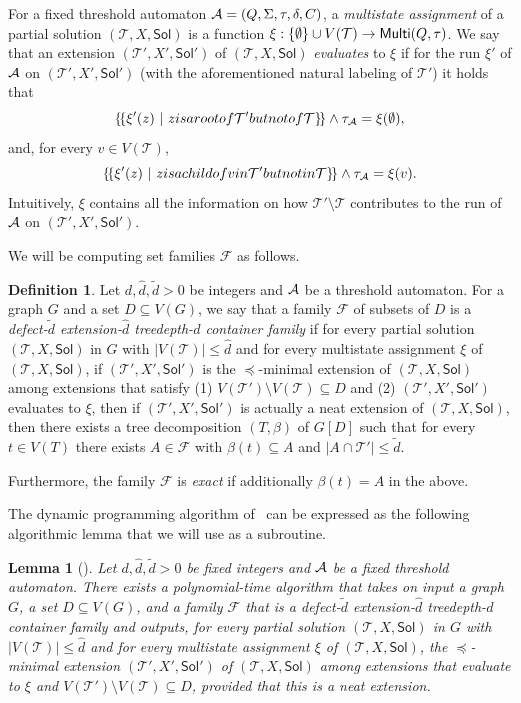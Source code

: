 \documentclass[11pt,a4paper]{article}
\newtheorem{lemma}[theorem]{Lemma}
\theoremstyle{definition}
\newtheorem{definition}[theorem]{Definition}
\def\T{\mathcal{T}}
\def\Sol{\mathsf{Sol}}
\begin{document}
For a fixed threshold automaton $\mathcal{A} = (Q,\Sigma,\tau,\delta,C)$,
a \emph{multistate assignment} of a partial solution $(\T,X,\Sol)$
is a function $\xi : \{\emptyset\} \cup V(\T) \to \Multi(Q,\tau)$. 
We say that an extension $(\T',X',\Sol')$ of $(\T,X,\Sol)$ 
\emph{evaluates} to $\xi$ if for the run $\xi'$
of $\mathcal{A}$ on $(\T',X',\Sol')$ (with the aforementioned natural labeling of $\T'$)
it holds that
        \[ \lmset \xi'(z)~|~z\textrm{ is a root of }\T'\textrm{ but not of }\T \rmset \wedge \tau_\Aa = \xi(\emptyset), \]
         and, for every $v \in V(\T)$,
        \[ \lmset \xi'(z)~|~z \textrm{ is a child of }v \textrm{ in } \T' \textrm{ but not in }\T\rmset \wedge \tau_\Aa = \xi(v). \]
Intuitively, $\xi$ contains all the information
on how $\T' \setminus \T$ contributes to the run of $\mathcal{A}$ on $(\T',X',\Sol')$. 

We will be computing set families $\mathcal{F}$ as follows. 
\begin{definition}
Let $d,\widehat{d},\widetilde{d} > 0$ be integers
and $\mathcal{A}$ be a threshold automaton.
For a graph $G$ and a set $D \subseteq V(G)$, we say
that a family $\mathcal{F}$ of subsets of $D$
is a \emph{defect-$\widetilde{d}$ extension-$\widehat{d}$ treedepth-$d$
  container family} 
if for every partial solution $(\T,X,\Sol)$ in $G$ with $|V(\T)| \leq \widehat{d}$
and for every multistate assignment $\xi$ of $(\T,X,\Sol)$,
if $(\T',X',\Sol')$ is the $\preceq$-minimal extension of $(\T,X,\Sol)$
among extensions that satisfy (1) $V(\T') \setminus V(\T) \subseteq D$ and (2)
$(\T',X',\Sol')$ evaluates to $\xi$, then
if $(\T',X',\Sol')$ is actually a neat extension of $(\T,X,\Sol)$, then
there exists a tree decomposition $(T,\beta)$ of $G[D]$
such that for every $t \in V(T)$ there exists $A \in \mathcal{F}$
with $\beta(t) \subseteq A$ and $|A \cap \T'| \leq \widetilde{d}$. 

Furthermore, the family $\mathcal{F}$ is \emph{exact} if
additionally $\beta(t) = A$ in the above. 
\end{definition}

The dynamic programming algorithm of~\cite[Section~3]{DBLP:conf/soda/ChudnovskyMPPR24} can be expressed
as the following algorithmic lemma that we will use as a subroutine.
\begin{lemma}[\cite{DBLP:conf/soda/ChudnovskyMPPR24}]\label{lem:dp-algo}
Let $d,\widehat{d},\widetilde{d} > 0$ be fixed integers
and $\mathcal{A}$ be a fixed threshold automaton.
There exists a polynomial-time algorithm that takes on input a graph $G$, a set $D \subseteq V(G)$,
and a family $\mathcal{F}$ that is a defect-$\widetilde{d}$ extension-$\widehat{d}$ treedepth-$d$
container family 
and outputs, 
for every partial solution $(\T,X,\Sol)$ in $G$ with $|V(\T)| \leq \widehat{d}$
and for every multistate assignment $\xi$ of $(\T,X,\Sol)$,
the $\preceq$-minimal extension $(\T',X',\Sol')$ of $(\T,X,\Sol)$ 
among extensions that evaluate to $\xi$ and $V(\T') \setminus V(\T) \subseteq D$, 
provided that this is a neat extension.
\end{lemma}
\end{document}
